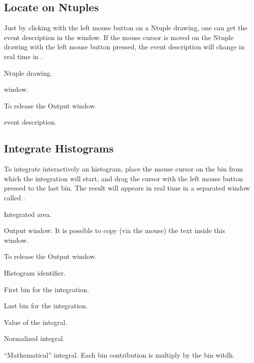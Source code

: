 \clearpage

\subsection{Locate on Ntuples}
Just by clicking with the left mouse button on a Ntuple drawing, one can get
the event description in the \PL{} window. If the mouse cursor is moved
on the Ntuple drawing with the left mouse button pressed, the event description
will change in real time in \PL.

\begin{EnumZB}
\item Ntuple drawing.
\item \PL{} window.
\item To release the Output window.
\item event description.
\end{EnumZB}

\clearpage

\subsection{Integrate Histograms}
To integrate interactively an histogram, place the mouse cursor on the
bin from which the integration will start, and drag the cursor with the
left mouse button pressed to the last bin. The result will appears in real time
in a separated window called \PL{} .

\begin{EnumZB}
\item Integrated area.
\item Output window. It is possible to copy (via the mouse) the
      text inside this window.
\item To release the Output window.
\end{EnumZB}
\begin{EnumZW}
\item Histogram identifier.
\item First bin for the integration.
\item Last bin for the integration.
\item Value of the integral.
\item Normalized integral.
\item ``Mathematical'' integral. Each bin contribution is
      multiply by the bin witdh.
\end{EnumZW}

\clearpage

